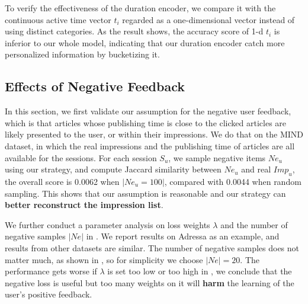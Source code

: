 To verify the effectiveness of the duration encoder, we compare it with the continuous active time vector $t_i$ regarded as a one-dimensional vector instead of using distinct categories. As the result shows, the accuracy score of 1-d $t_i$ is inferior to our whole model, indicating that our duration encoder catch more personalized information by bucketizing it.

\subsection{Effects of Negative Feedback}
In this section, we first validate our assumption for the negative user feedback,
which is that articles whose publishing time is close to the clicked articles are
likely presented to the user, or within their impressions.
We do that on the MIND dataset, in which the real impressions and the
publishing time of articles are all available for the sessions. 
For each session $S_u$, we sample negative items $Ne_u$ using our strategy, and compute Jaccard similarity between $Ne_u$ and real $Imp_u$, the overall score is 0.0062 when $|Ne_u=100|$, compared with 0.0044 when random sampling.
This shows that our assumption is reasonable and our strategy can \textbf{better reconstruct the impression list}.

We further conduct a parameter analysis on loss weights $\lambda$ and the number of negative samples $|Ne|$ 
in . We report results on Adressa as an example, and results from other datasets are similar. 
The number of negative samples does not matter much, as shown in , 
so for simplicity we choose $|Ne|=20$. The performance gets worse if $\lambda$ is set too low or too 
high in , we conclude that the negative loss is useful but too many weights on it will \textbf{harm} the learning of the user's positive feedback.

